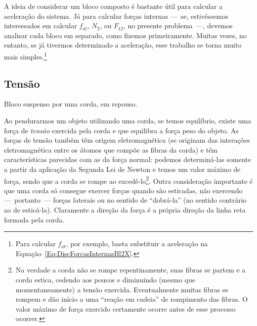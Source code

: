 A ideia de considerar um bloco composto é bastante útil para calcular a aceleração do sistema. Já para calcular forças internas ---~se, estivéssemos interessados em calcular $f_{at}$, $N_2$, ou $F_{12}$, no presente problema~---, devemos analisar cada bloco em separado, como fizemos primeiramente. Muitas vezes, no entanto, se já tivermos determinado a aceleração, esse trabalho se torna muito mais simples.\footnote[][-5cm]{Para calcular $f_{at}$, por exemplo, basta substituir a aceleração na Equação~\eqref{Eq:DiscForcasInternasBl2X}.}

\subsection{Tensão} 

\begin{marginfigure}[-2cm]
\centering
{}
\caption{Bloco suspenso por uma corda, em repouso.\label{Fig:Tensao:BlocoSuspenso}}
\end{marginfigure}

Ao pendurarmos um objeto utilizando uma corda, se temos equilíbrio, existe uma força de \emph{tensão} exercida pela corda e que equilibra a força peso do objeto. As forças de tensão também têm origem eletromagnética (se originam das interações eletromagnética entre os átomos que compõe as fibras da corda) e têm características parecidas com as da força normal: podemos determiná-las somente a partir da aplicação da Segunda Lei de Newton e temos um valor máximo de força, sendo que a corda se rompe ao excedê-lo\footnote{Na verdade a corda não se rompe repentinamente, suas fibras se partem e a corda estica, cedendo aos poucos e diminuindo (mesmo que momentaneamente) a tensão exercida. Eventualmente muitas fibras se rompem e dão início a uma ``reação em cadeia'' de rompimento das fibras. O valor máximo de força exercido certamente ocorre antes de esse processo ocorrer.}. Outra consideração importante é que uma corda só consegue exercer forças quando são esticadas, não exercendo ---~portanto~--- forças laterais ou no sentido de ``dobrá-la'' (no sentido contrário ao de esticá-la). Claramente a direção da força é a própria direção da linha reta formada pela corda.

